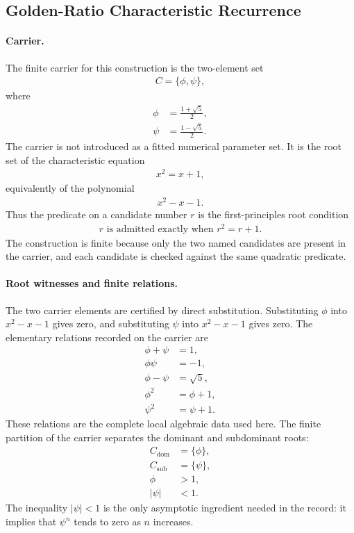 \subsection{Golden-Ratio Characteristic Recurrence}\label{sec:binet-golden-ratio-characteristic-recurrence}

\paragraph{Carrier.}
The finite carrier for this construction is the two-element set
$$
\begin{aligned}
C=\{\phi,\psi\},
\end{aligned}
$$
where
$$
\begin{aligned}
\phi&=\frac{1+\sqrt{5}}{2},\\
\psi&=\frac{1-\sqrt{5}}{2}.
\end{aligned}
$$
The carrier is not introduced as a fitted numerical parameter set. It is the root set of the characteristic equation
$$
\begin{aligned}
x^2=x+1,
\end{aligned}
$$
equivalently of the polynomial
$$
\begin{aligned}
x^2-x-1.
\end{aligned}
$$
Thus the predicate on a candidate number $r$ is the first-principles root condition
$$
\begin{aligned}
r \text{ is admitted exactly when } r^2=r+1.
\end{aligned}
$$
The construction is finite because only the two named candidates are present in the carrier, and each candidate is checked against the same quadratic predicate.

\paragraph{Root witnesses and finite relations.}
The two carrier elements are certified by direct substitution. Substituting $\phi$ into $x^2-x-1$ gives zero, and substituting $\psi$ into $x^2-x-1$ gives zero. The elementary relations recorded on the carrier are
$$
\begin{aligned}
\phi+\psi&=1,\\
\phi\psi&=-1,\\
\phi-\psi&=\sqrt{5},\\
\phi^2&=\phi+1,\\
\psi^2&=\psi+1.
\end{aligned}
$$
These relations are the complete local algebraic data used here. The finite partition of the carrier separates the dominant and subdominant roots:
$$
\begin{aligned}
C_{\mathrm{dom}}&=\{\phi\},\\
C_{\mathrm{sub}}&=\{\psi\},\\
\phi&>1,\\
|\psi|&<1.
\end{aligned}
$$
The inequality $|\psi|<1$ is the only asymptotic ingredient needed in the record: it implies that $\psi^n$ tends to zero as $n$ increases.

